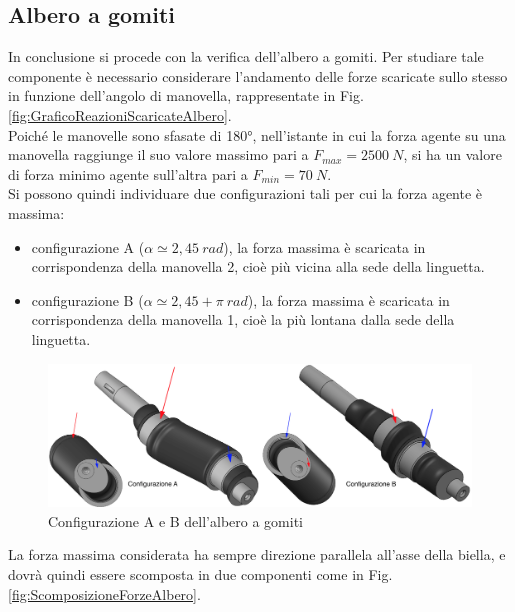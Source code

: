 \subsection{Albero a gomiti}
In conclusione si procede con la verifica dell'albero a gomiti. Per studiare tale componente è necessario considerare l'andamento delle forze scaricate sullo stesso in funzione dell'angolo di manovella, rappresentate in Fig.\ref{fig:GraficoReazioniScaricateAlbero}.\\
Poiché le manovelle sono sfasate di 180°, nell'istante in cui la forza agente su una manovella raggiunge il suo valore massimo pari a $F_{max}=2500\ N$, si ha un valore di forza minimo agente sull'altra pari a $F_{min}=70\ N$.\\
Si possono quindi individuare due configurazioni tali per cui la forza agente è massima:
\begin{itemize}
    \item configurazione A ($\alpha\simeq 2,45\ rad$), la forza massima è scaricata in corrispondenza della manovella 2, cioè più vicina alla sede della linguetta.
    \item configurazione B ($\alpha\simeq 2,45+\pi\ rad$), la forza massima è scaricata in corrispondenza della manovella 1, cioè la più lontana dalla sede della linguetta.
\end{itemize}
\begin{figure}[h]
    \centering
    \includegraphics[scale=0.3]{Immagini/ConfigurazioneAlberoAB.png}
    \caption{Configurazione A e B dell'albero a gomiti}
    \label{fig:ConfigurazioneAlberoAB}
\end{figure}
La forza massima considerata ha sempre direzione parallela all'asse della biella, e dovrà quindi essere scomposta in due componenti come in Fig.\ref{fig:ScomposizioneForzeAlbero}.
